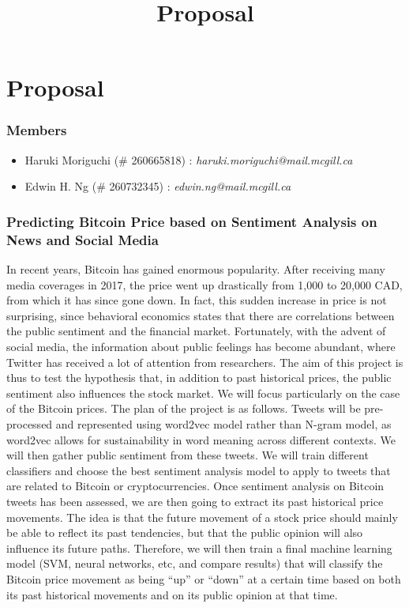 \documentclass[12pt,a4paper]{report}
\begin{document}
\title{Proposal\\
}


\setcounter{page}{1}
\thispagestyle{empty} 


\chapter*{Proposal}
\subsection*{Members}
\begin{itemize}
\item Haruki Moriguchi (\# 260665818) : \textit{haruki.moriguchi@mail.mcgill.ca}
\item Edwin H. Ng (\# 260732345) : \textit{edwin.ng@mail.mcgill.ca}
\end{itemize}

\subsection*{Predicting Bitcoin Price based on Sentiment Analysis on News and Social Media}
\par \qquad In recent years, Bitcoin has gained enormous popularity. After receiving many media coverages in 2017, the price went up drastically from 1,000 to 20,000 CAD, from which it has since gone down. In fact, this sudden increase in price is not surprising, since behavioral economics states that there are correlations between the public sentiment and the financial market. Fortunately, with the advent of social media, the information about public feelings has become abundant, where Twitter has received a lot of attention from researchers. The aim of this project is thus to test the hypothesis that, in addition to past historical prices, the public sentiment also influences the stock market. We will focus particularly on the case of the Bitcoin prices. The plan of the project is as follows. Tweets will be pre-processed and represented using word2vec model rather than N-gram model, as word2vec allows for sustainability in word meaning across different contexts. We will then gather public sentiment from these tweets. We will train different classifiers and choose the best sentiment analysis model to apply to tweets that are related to Bitcoin or cryptocurrencies. Once sentiment analysis on Bitcoin tweets has been assessed, we are then going to extract its past historical price movements. The idea is that the future movement of a stock price should mainly be able to reflect its past tendencies, but that the public opinion will also influence its future paths. Therefore, we will then train a final machine learning model (SVM, neural networks, etc, and compare results) that will classify the Bitcoin price movement as being ``up'' or ``down'' at a certain time based on both its past historical movements and on its public opinion at that time.
\\
\end{document}
